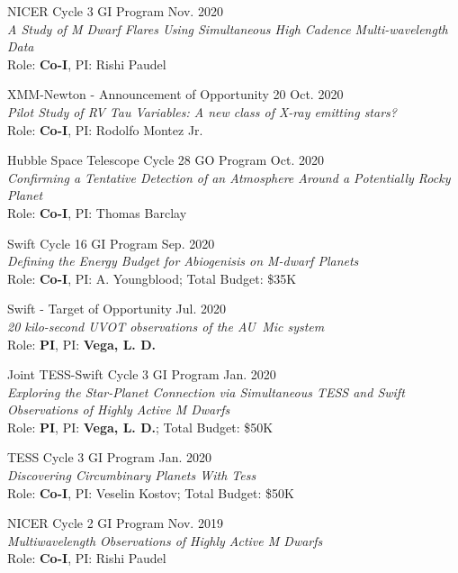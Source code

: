 \documentclass[12pt]{article}
\begin{document}
\begin{etaremune}
\item NICER Cycle 3 GI Program \hfill Nov. 2020 \\
\textit{A Study of M Dwarf Flares Using Simultaneous High Cadence Multi-wavelength Data} \\ Role: \textbf{Co-I}, PI: Rishi Paudel

\item XMM-Newton - Announcement of Opportunity 20 \hfill Oct. 2020 \\
\textit{Pilot Study of RV Tau Variables: A new class of X-ray emitting stars?} \\ Role: \textbf{Co-I}, PI: Rodolfo Montez Jr.

\item Hubble Space Telescope Cycle 28 GO Program \hfill Oct. 2020 \\
\textit{Confirming a Tentative Detection of an Atmosphere Around a Potentially Rocky Planet} \\ Role: \textbf{Co-I}, PI: Thomas Barclay

\item Swift Cycle 16 GI Program  \hfill Sep. 2020 \\
\textit{Defining the Energy Budget for Abiogenisis on M-dwarf Planets} \\ Role: \textbf{Co-I}, PI: A. Youngblood; Total Budget: \$35K

\item Swift - Target of Opportunity \hfill Jul. 2020 \\
\textit{20 kilo-second UVOT observations of the AU~Mic system} \\ Role: \textbf{PI}, PI: \textbf{Vega, L. D.}

\item Joint TESS-Swift Cycle 3 GI Program  \hfill Jan. 2020 \\
\textit{Exploring the Star-Planet Connection via Simultaneous TESS and Swift Observations of Highly Active M Dwarfs} \\ Role: \textbf{PI}, PI: \textbf{Vega, L. D.}; Total Budget: \$50K 

\item TESS Cycle 3 GI Program  \hfill Jan. 2020 \\
\textit{Discovering Circumbinary Planets With Tess} \\ Role: \textbf{Co-I}, PI: Veselin Kostov; Total Budget: \$50K

\item NICER Cycle 2 GI Program \hfill Nov. 2019 \\
\textit{Multiwavelength Observations of Highly Active M Dwarfs} \\ Role: \textbf{Co-I}, PI: Rishi Paudel


\end{etaremune}
\end{document}
